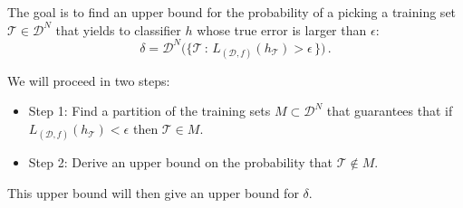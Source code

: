 \documentclass[10pt, table, handout]{beamer}
\begin{document}
\begin{frame}[fragile]{}

The goal is to find an upper bound for the probability of a picking a training set $\mathcal{T}\in \mathcal{D}^N$ that yields to classifier $h$ whose true error is larger than $\epsilon$:
$$
\delta = \mathcal{D}^N\big(\{\mathcal{T}\,:\, L_{(\mathcal{D},f)}(h_{\mathcal{T}}) > \epsilon\,\}\big)\,.
$$\pause

We will proceed in two steps:
\begin{itemize}
\item Step 1: Find a partition of the training sets $M\subset \mathcal{D}^N$ that guarantees that if $L_{(\mathcal{D},f)}(h_{\mathcal{T}}) < \epsilon$ then $\mathcal{T}\in M$.

\item Step 2: Derive an upper bound on the probability that $\mathcal{T}\not\in M$.
\end{itemize}

This upper bound will then give an upper bound for $\delta$. 

\end{frame}
\end{document}
